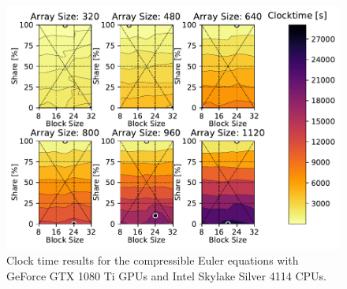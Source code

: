 \documentclass[mca,article,submit,moreauthors,pdftex]{Definitions/mdpi}
\def\oldCPU{Intel Skylake Silver 4114} %
\def\oldGPU{GeForce GTX 1080 Ti}
\begin{document}
\begin{figure}[htbp]
\widefigure
    \includegraphics[scale=0.85]{figs/clockTimeSwepteulerOld.pdf}
    \caption{Clock time results  for the compressible Euler equations with \oldGPU{} GPUs and \oldCPU{} CPUs.}
    \label{fig:clocktimeOldEuler}
\end{figure}
\end{document}
